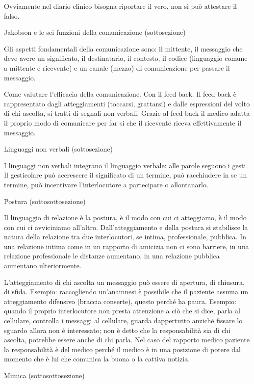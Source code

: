 \documentclass[]{article}
\begin{document}
Ovviamente nel diario clinico bisogna riportare il vero, non si può
attestare il falso.

Jakobson e le sei funzioni della comunicazione (sottosezione)

Gli aspetti fondamentali della comunicazione sono: il mittente, il
messaggio che deve avere un significato, il destinatario, il contesto,
il codice (linguaggio comune a mittente e ricevente) e un canale (mezzo)
di comunicazione per passare il messaggio.

Come valutare l'efficacia della comunicazione. Con il feed back. Il feed
back è rappresentato dagli atteggiamenti (toccarsi, grattarsi) e dalle
espressioni del volto di chi ascolta, si tratti di segnali non verbali.
Grazie al feed back il medico adatta il proprio modo di comunicare per
far si che il ricevente riceva effettivamente il messaggio.

Linguaggi non verbali (sottosezione)

I linguaggi non verbali integrano il linguaggio verbale: alle parole
seguono i gesti. Il gesticolare può accrescere il significato di un
termine, può racchiudere in se un termine, può incentivare
l'interlocutore a partecipare o allontanarlo.

Postura (sottosottosezione)

Il linguaggio di relazione è la postura, è il modo con cui ci
atteggiamo, è il modo con cui ci avviciniamo all'altro.
Dall'atteggiamento e della postura si stabilisce la natura della
relazione tra due interlocutori, se intima, professionale, pubblica. In
una relazione intima come in un rapporto di amicizia non ci sono
barriere, in una relazione professionale le distanze aumentano, in una
relazione pubblica aumentano ulteriormente.

L'atteggiamento di chi ascolta un messaggio può essere di apertura, di
chiusura, di sfida. Esempio: raccogliendo un'anamnesi è possibile che il
paziente assuma un atteggiamento difensivo (braccia conserte), questo
perché ha paura. Esempio: quando il proprio interlocutore non presta
attenzione a ciò che si dice, parla al cellulare, controlla i messaggi
al cellulare, guarda dappertutto anziché fissare lo sguardo allora non è
interessato; non è detto che la responsabilità sia di chi ascolta,
potrebbe essere anche di chi parla. Nel caso del rapporto medico
paziente la responsabilità è del medico perché il medico è in una
posizione di potere dal momento che è lui che comunica la buona o la
cattiva notizia.

Mimica (sottosottosezione)
\end{document}
